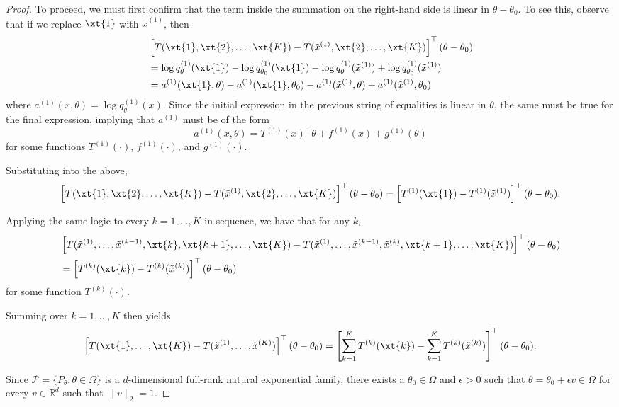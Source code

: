 \documentclass[12pt]{article}
\begin{document}
\begin{proof}
To proceed, we must first confirm that the term inside the summation on the right-hand side is linear in $\theta-\theta_0$. To see this, observe that if we replace $\xt{1}$ with $\tilde{x}^{(1)}$, then 
\begin{align*}
&\left[T(\xt{1},\xt{2},\dots,\xt{K})- T(\tilde{x}^{(1)},\xt{2},\dots,\xt{K})\right]^\top(\theta-\theta_0) \\
&= \log q^{(1)}_\theta(\xt{1}) - \log q^{(1)}_{\theta_0}(\xt{1}) - \log q^{(1)}_\theta(\tilde{x}^{(1)}) + \log q^{(1)}_{\theta_0}(\tilde{x}^{(1)}) \\
&= a^{(1)}(\xt{1},\theta) - a^{(1)}(\xt{1},\theta_0) - a^{(1)}(\tilde{x}^{(1)},\theta) + a^{(1)}(\tilde{x}^{(1)},\theta_0)
\end{align*}
where $a^{(1)}(x,\theta)=\log q_\theta^{(1)}(x)$. Since the initial expression in the previous string of equalities is linear in $\theta$, the same must be true for the final expression, implying that $a^{(1)}$ must be of the form 
$$
a^{(1)}(x,\theta) = T^{(1)}(x)^\top\theta + f^{(1)}(x) + g^{(1)}(\theta) 
$$
for some functions $T^{(1)}(\cdot)$, $f^{(1)}(\cdot)$, and $g^{(1)}(\cdot)$.

Substituting into the above, 
$$
\left[T(\xt{1},\xt{2},\dots,\xt{K})- T(\tilde{x}^{(1)},\xt{2},\dots,\xt{K})\right]^\top(\theta-\theta_0)
= \left[T^{(1)}(\xt{1})-T^{(1)}(\tilde{x}^{(1)})\right]^\top(\theta-\theta_0).
$$

Applying the same logic to every $k=1,\dots,K$ in sequence, we have that for any $k$,
\begin{align*}
&\left[T(\tilde{x}^{(1)},\dots,\tilde{x}^{(k-1)},\xt{k},\xt{k+1},\dots,\xt{K})- T(\tilde{x}^{(1)},\dots,\tilde{x}^{(k-1)},\tilde{x}^{(k)},\xt{k+1},\dots,\xt{K})\right]^\top(\theta-\theta_0) \\
&= \left[T^{(k)}(\xt{k})-T^{(k)}(\tilde{x}^{(k)})\right]^\top(\theta-\theta_0)
\end{align*}
for some function $T^{(k)}(\cdot)$.

Summing over $k=1,\dots,K$ then yields
$$
\left[T(\xt{1},\dots,\xt{K})- T(\tilde{x}^{(1)},\dots,\tilde{x}^{(K)})\right]^\top(\theta-\theta_0) 
= \left[\sum_{k=1}^KT^{(k)}(\xt{k})-\sum_{k=1}^KT^{(k)}(\tilde{x}^{(k)})\right]^\top(\theta-\theta_0).
$$

Since $\mathcal{P}=\{P_\theta:\theta\in\Omega\}$ is a $d$-dimensional full-rank natural exponential family, there exists a $\theta_0\in\Omega$ and $\epsilon>0$ such that $\theta = \theta_0 + \epsilon v\in\Omega$ for every $v\in\mathbb{R}^d$ such that $\|v\|_2=1$. 


\end{proof}
\end{document}

